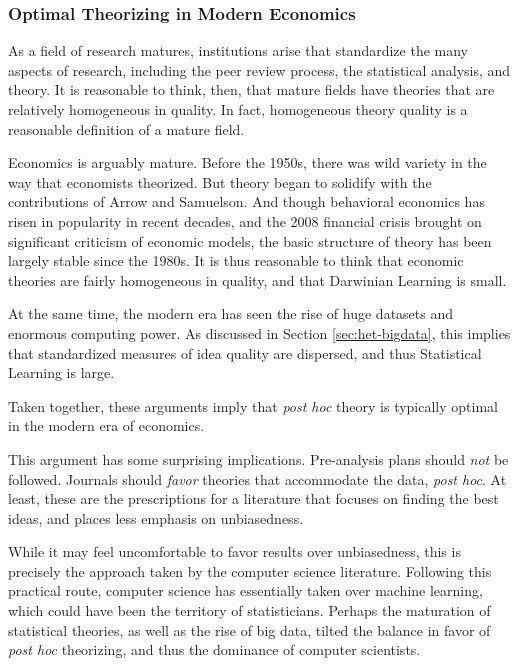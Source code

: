 \documentclass[12pt,english]{article}
\theoremstyle{plain}
\theoremstyle{plain}
\begin{document}
\subsubsection{Optimal Theorizing in Modern Economics}\label{sec:het-econcomment}

As a field of research matures, institutions arise that standardize the many aspects of research, including the peer review process, the statistical analysis, and  theory. It is reasonable to think, then, that mature fields have theories that are relatively homogeneous in quality. In fact, homogeneous theory quality is a reasonable definition of a mature field.

Economics is arguably mature. Before the 1950s, there was wild variety in the way that economists theorized. But theory began to solidify with the contributions of Arrow and Samuelson. And though behavioral economics has risen in popularity in recent decades, and the 2008 financial crisis brought on significant criticism of economic models, the basic structure of theory has been largely stable since the 1980s. It is thus reasonable to think that economic theories are fairly homogeneous in quality, and that Darwinian Learning is small. 

At the same time, the modern era has seen the rise of huge datasets and enormous computing power. As discussed in Section \ref{sec:het-bigdata}, this implies that standardized measures of idea quality are dispersed, and thus Statistical Learning is large. 

Taken together, these arguments imply that \emph{post hoc} theory is typically optimal in the modern era of economics.

This argument has some surprising implications. Pre-analysis plans should \emph{not} be followed.  Journals should \emph{favor}  theories that accommodate the data, \emph{post hoc}. At least, these are the prescriptions for a literature that focuses on finding the best ideas, and places less emphasis on unbiasedness. 

While it may feel uncomfortable to favor results over unbiasedness, this is precisely the approach taken by the computer science literature. Following this practical route, computer science has essentially taken over machine learning, which could have been the territory of statisticians. Perhaps the maturation of statistical theories, as well as the rise of big data, tilted the balance in favor of \emph{post hoc} theorizing, and thus the dominance of computer scientists.
\end{document}
